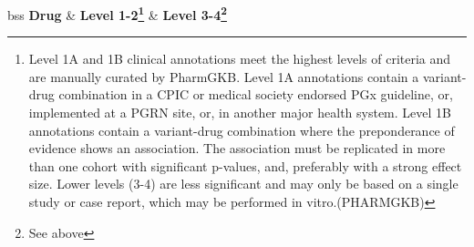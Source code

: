 \documentclass{report}
\begin{document}
\scriptsize
\begin{tabularx}{\textwidth}{bss}
\textbf{Drug} & \textbf{Level 1-2\footnote{ Level 1A and 1B clinical annotations meet the highest levels of criteria and are manually curated by PharmGKB. Level 1A annotations contain a variant-drug combination in a CPIC or medical society endorsed PGx guideline, or, implemented at a PGRN site, or, in another major health system. Level 1B annotations contain a variant-drug combination where the preponderance of evidence shows an association. The association must be replicated in more than one cohort with significant p-values, and, preferably with a strong effect size. Lower levels (3-4) are less significant and may only be based on a single study or case report, which may be performed in vitro.(PHARMGKB) }} & \textbf{Level 3-4\footnote{ See above }}   \\

\end{tabularx}
\end{document}
